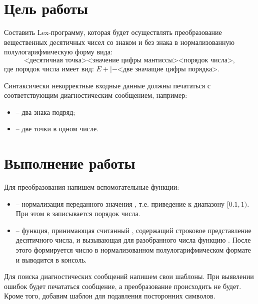 





\tableofcontents
\newpage

\section{Цель работы}

Составить Lex-программу, которая будет осуществлять преобразование вещественных десятичных чисел со знаком и без знака в нормализованную полулогарифмическую форму вида:
\begin{displaymath}
[+|-]\text{<десятичная точка>}\text{<значение цифры мантиссы>}\text{<порядок числа>},
\end{displaymath}
где порядок числа имеет вид: $E+|-\text{<две значащие цифры порядка>}$.

Синтаксически некорректные входные данные должны печататься с соответствующим диагностическим сообщением, например:

\begin{itemize}
	\item {} -- два знака подряд;
	\item {} -- две точки в одном числе.
\end{itemize}

\section{Выполнение работы}

Для преобразования напишем вспомогательные функции:

\begin{itemize}
	\item {} -- нормализация переданного значения , т.е. приведение к диапазону $[0.1, 1)$. При этом в  записывается порядок числа.
	\item {} -- функция, принимающая считанный , содержащий строковое представление десятичного числа, и вызывающая для разобранного числа функцию . После этого формируется число в нормализованном полулогарифмическом формате и выводится в консоль.
\end{itemize}

Для поиска диагностических сообщений напишем свои шаблоны. При выявлении ошибок будет печататься сообщение, а преобразование происходить не будет. Кроме того, добавим шаблон для подавления посторонних символов.


